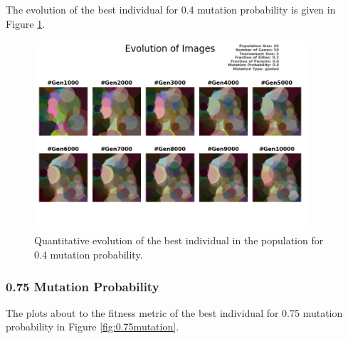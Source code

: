 \documentclass{assignment}
\begin{document}
The evolution of the best individual for 0.4 mutation probability is given in Figure \ref{fig:0.4mutation_image}.

\begin{figure}[!htb]
    \centering
    \includegraphics[width=0.9\textwidth]{figures/images_output_20_50_5_0.2_0.6_0.4_guided.png}
    \caption{Quantitative evolution of the best individual in the population for 0.4 mutation probability.}
    \label{fig:0.4mutation_image}
\end{figure}

\subsubsection{0.75 Mutation Probability}

The plots about to the fitness metric of the best individual for 0.75 mutation probability in Figure \ref{fig:0.75mutation}.
\end{document}
